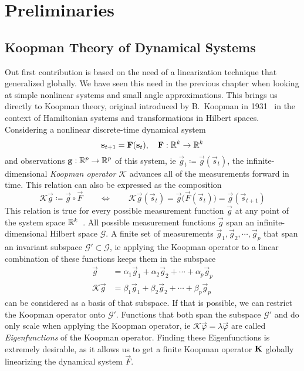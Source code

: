 \chapter{Preliminaries}
\label{c:preliminaries}



\section{Koopman Theory of Dynamical Systems}

	Out first contribution is based on the need of a linearization technique that generalized globally. We have seen this need in the previous chapter when looking at simple nonlinear systems and small angle approximations. This brings us directly to Koopman theory, original introduced by B.~Koopman in 1931~\cite{koopmanHamiltonianSystemsTransformation1931} in the context of Hamiltonian systems and transformations in Hilbert spaces. Considering a nonlinear discrete-time dynamical system
	\begin{equation*}
		\boldsymbol{\mathrm{s}}_{t + 1} = \boldsymbol{\mathrm{F}}(\boldsymbol{\mathrm{s}}_t),\quad \boldsymbol{\mathrm{F}} : \mathbb{R}^k \to \mathbb{R}^k
	\end{equation*}
	and observations \( \boldsymbol{\mathrm{g}} : \mathbb{R}^p \to \mathbb{R}^p \) of this system, \ac{ie} \( \vec{g}_t \coloneqq \vec{g}(\vec{s}_t) \), the infinite-dimensional \emph{Koopman operator} \(\mathcal{K}\) advances all of the measurements forward in time. This relation can also be expressed as the composition
	\begin{equation*}
		\mathcal{K} \vec{g} \coloneqq \vec{g} \circ \vec{F} \qquad\iff\qquad \mathcal{K} \vec{g}(\vec{s}_t) = \vec{g}\big( \vec{F}(\vec{s}_t) \big) = \vec{g}(\vec{s}_{t + 1})
	\end{equation*}
	This relation is true for every possible measurement function \( \vec{g} \) at any point of the system space \( \mathbb{R}^k \)~\cite{bruntonKoopmanInvariantSubspaces2016}. All possible measurement functions \( \vec{g} \) span an infinite-dimensional Hilbert space \( \mathcal{G} \). A finite set of measurements \( \vec{g}_1, \vec{g}_2, \cdots, \vec{g}_p \) that span an invariant subspace \( \mathcal{G}' \subset \mathcal{G} \), \ac{ie} applying the Koopman operator to a linear combination of these functions keeps them in the subspace
	\begin{align*}
		\vec{g} &= \alpha_1 \vec{g}_1 + \alpha_2 \vec{g}_2 + \cdots + \alpha_p \vec{g}_p \\
		\mathcal{K} \vec{g} &= \beta_1 \vec{g}_1 + \beta_2 \vec{g}_2 + \cdots + \beta_p \vec{g}_p
	\end{align*}
	can be considered as a basis of that subspace. If that is possible, we can restrict the Koopman operator onto \( \mathcal{G}' \). Functions that both span the subspace \(\mathcal{G}'\) and do only scale when applying the Koopman operator, \ac{ie} \( \mathcal{K} \vec{\varphi} = \lambda \vec{\varphi} \) are called \emph{Eigenfunctions} of the Koopman operator. Finding these Eigenfunctions is extremely desirable, as it allows us to get a finite Koopman operator \( \boldsymbol{\mathrm{K}} \) globally linearizing the dynamical system \( \vec{F} \).

